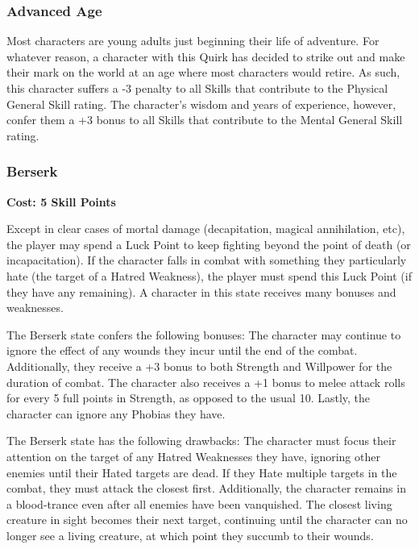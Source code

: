 \documentclass[oneside]{book}
\begin{document}
\begin{multicols}{2}

\subsubsection{Advanced Age}
Most characters are young adults just beginning their life of adventure. For whatever reason, a character with this Quirk has decided to strike out and make their mark on the world at an age where most characters would retire. As such, this character suffers a -3 penalty to all Skills that contribute to the Physical General Skill rating. The character's wisdom and years of experience, however, confer them a +3 bonus to all Skills that contribute to the Mental General Skill rating.


\subsubsection{Berserk}
\textbf{\small Cost: 5 Skill Points}

Except in clear cases of mortal damage (decapitation, magical annihilation, etc), the player may spend a Luck Point to keep fighting beyond the point of death (or incapacitation). If the character falls in combat with something they particularly hate (the target of a Hatred Weakness), the player must spend this Luck Point (if they have any remaining). A character in this state receives many bonuses and weaknesses.

The Berserk state confers the following bonuses: The character may continue to ignore the effect of any wounds they incur until the end of the combat. Additionally, they receive a +3 bonus to both Strength and Willpower for the duration of combat. The character also receives a +1 bonus to melee attack rolls for every 5 full points in Strength, as opposed to the usual 10. Lastly, the character can ignore any Phobias they have.

The Berserk state has the following drawbacks: The character must focus their attention on the target of any Hatred Weaknesses they have, ignoring other enemies until their Hated targets are dead. If they Hate multiple targets in the combat, they must attack the closest first. Additionally, the character remains in a blood-trance even after all enemies have been vanquished. The closest living creature in sight becomes their next target, continuing until the character can no longer see a living creature, at which point they succumb to their wounds. 


\end{multicols}
\end{document}
